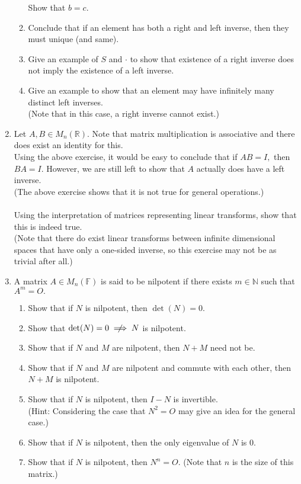 \documentclass[12pt]{article}
\begin{document}
\begin{enumerate}[leftmargin=*]
\begin{enumerate}[nosep]
		Show that $b = c.$
		\item Conclude that if an element has both a right and left inverse, then they must unique (and same).
		\item Give an example of $S$ and $\cdot$ to show that existence of a right inverse does not imply the existence of a left inverse.
		\item Give an example to show that an element may have infinitely many distinct left inverses.\\
		(Note that in this case, a right inverse cannot exist.)
	\end{enumerate}
	\item Let $A, B \in M_n(\mathbb{R}).$ Note that matrix multiplication is associative and there does exist an identity for this. \\
	Using the above exercise, it would be easy to conclude that if $AB = I,$ then $BA = I.$ However, we are still left to show that $A$ actually does have a left inverse.\\
	(The above exercise shows that it is not true for general operations.)\\~\\
	Using the interpretation of matrices representing linear transforms, show that this is indeed true.\\
	(Note that there do exist linear transforms between infinite dimensional spaces that have only a one-sided inverse, so this exercise may not be as trivial after all.)
	\item A matrix $A \in M_n(\mathbb{F})$ is said to be nilpotent if there exists $m \in \mathbb{N}$ such that $A^m = O.$
	\begin{enumerate} 
		\item Show that if $N$ is nilpotent, then $\det(N) = 0.$
		\item Show that $\det(N) = 0 \centernot\implies N$ is nilpotent.
		\item Show that if $N$ and $M$ are nilpotent, then $N+M$ need not be.
		\item Show that if $N$ and $M$ are nilpotent and commute with each other, then $N+M$ is nilpotent.
		\item Show that if $N$ is nilpotent, then $I - N$ is invertible.\\
		(Hint: Considering the case that $N^2 = O$ may give an idea for the general case.)
		\item Show that if $N$ is nilpotent, then the only eigenvalue of $N$ is $0.$
		\item Show that if $N$ is nilpotent, then $N^n = O.$ (Note that $n$ is the size of this matrix.)

\end{enumerate}
\end{enumerate}
\end{document}
